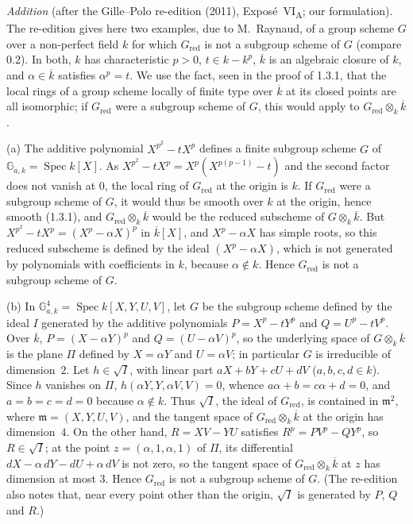 

\medskip\noindent
\emph{Addition} (after the Gille--Polo re-edition (2011), Exposé~VI\textsubscript{A}; our
formulation). The re-edition gives here two examples, due to M.~Raynaud, of a group scheme \(G\)
over a non-perfect field \(k\) for which \(G_{\mathrm{red}}\) is not a subgroup scheme of \(G\)
(compare 0.2). In both, \(k\) has characteristic \(p>0\), \(t\in k-k^p\), \(\overline k\) is an
algebraic closure of \(k\), and \(\alpha\in\overline k\) satisfies \(\alpha^p=t\). We use the fact,
seen in the proof of 1.3.1, that the local rings of a group scheme locally of finite type over
\(\overline k\) at its closed points are all isomorphic; if \(G_{\mathrm{red}}\) were a subgroup
scheme of \(G\), this would apply to \(G_{\mathrm{red}}\otimes_k\overline k\).

(a) The additive polynomial \(X^{p^2}-tX^p\) defines a finite subgroup scheme \(G\) of
\(\mathbb G_{a,k}=\operatorname{Spec}k[X]\). As \(X^{p^2}-tX^p=X^p(X^{p(p-1)}-t)\) and the second
factor does not vanish at \(0\), the local ring of \(G_{\mathrm{red}}\) at the origin is \(k\). If
\(G_{\mathrm{red}}\) were a subgroup scheme of \(G\), it would thus be smooth over \(k\) at the
origin, hence smooth (1.3.1), and \(G_{\mathrm{red}}\otimes_k\overline k\) would be the reduced
subscheme of \(G\otimes_k\overline k\). But \(X^{p^2}-tX^p=(X^p-\alpha X)^p\) in \(\overline k[X]\),
and \(X^p-\alpha X\) has simple roots, so this reduced subscheme is defined by the ideal
\((X^p-\alpha X)\), which is not generated by polynomials with coefficients in \(k\), because
\(\alpha\notin k\). Hence \(G_{\mathrm{red}}\) is not a subgroup scheme of \(G\).

(b) In \(\mathbb G^4_{a,k}=\operatorname{Spec}k[X,Y,U,V]\), let \(G\) be the subgroup scheme defined
by the ideal \(I\) generated by the additive polynomials \(P=X^p-tY^p\) and \(Q=U^p-tV^p\). Over
\(\overline k\), \(P=(X-\alpha Y)^p\) and \(Q=(U-\alpha V)^p\), so the underlying space of
\(G\otimes_k\overline k\) is the plane \(\Pi\) defined by \(X=\alpha Y\) and \(U=\alpha V\); in
particular \(G\) is irreducible of dimension~\(2\). Let \(h\in\sqrt I\), with linear part
\(aX+bY+cU+dV\) (\(a,b,c,d\in k\)). Since \(h\) vanishes on \(\Pi\), \(h(\alpha Y,Y,\alpha V,V)=0\),
whence \(a\alpha+b=c\alpha+d=0\), and \(a=b=c=d=0\) because \(\alpha\notin k\). Thus \(\sqrt I\),
the ideal of \(G_{\mathrm{red}}\), is contained in \(\mathfrak m^2\), where \(\mathfrak m=(X,Y,U,V)\),
and the tangent space of \(G_{\mathrm{red}}\otimes_k\overline k\) at the origin has dimension~\(4\).
On the other hand, \(R=XV-YU\) satisfies \(R^p=PV^p-QY^p\), so \(R\in\sqrt I\); at the point
\(z=(\alpha,1,\alpha,1)\) of \(\Pi\), its differential \(dX-\alpha\,dY-dU+\alpha\,dV\) is not zero, so
the tangent space of \(G_{\mathrm{red}}\otimes_k\overline k\) at \(z\) has dimension at most \(3\).
Hence \(G_{\mathrm{red}}\) is not a subgroup scheme of \(G\). (The re-edition also notes that, near
every point other than the origin, \(\sqrt I\) is generated by \(P\), \(Q\) and \(R\).)


